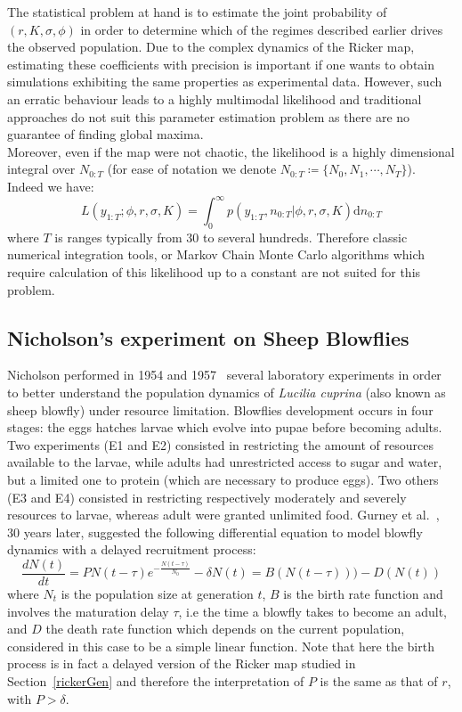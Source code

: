 \documentclass[12pt]{article}
\begin{document}
	The statistical problem at hand is to estimate the joint probability of $(r, K, \sigma, \phi)$ in order to determine which of the regimes described earlier drives the observed population. Due to the complex dynamics of the Ricker map, estimating these coefficients with precision is important if one wants to obtain simulations exhibiting the same properties as experimental data. However, such an erratic behaviour leads to a highly multimodal likelihood and traditional approaches do not suit this parameter estimation problem as there are no guarantee of finding global maxima. \\
	Moreover, even if the map were not chaotic, the likelihood is a highly dimensional integral over $N_{0:T}$ (for ease of notation we denote $N_{0:T} \coloneqq \{N_0, N_1, \cdots, N_T\}$). Indeed we have:
	\begin{equation}
	L(y_{1:T}; \phi, r, \sigma, K) = \int_{0}^{\infty}p(y_{1:T}, n_{0:T} | \phi, r, \sigma, K)\mathrm{d}n_{0:T}
	\end{equation}
	where $T$ is ranges typically from 30 to several hundreds. Therefore classic numerical integration tools, or Markov Chain Monte Carlo algorithms which require calculation of this likelihood up to a constant are not suited for this problem. 
	
	\subsection{Nicholson's experiment on Sheep Blowflies} \label{(Nicholson)}
	Nicholson performed in 1954 and 1957~\cite{nicholson1954outline, nicholson1957self} several
	laboratory experiments in order to better understand the population dynamics of \emph{Lucilia cuprina} (also known as sheep blowfly)
	under resource limitation. Blowflies development occurs in four stages: the eggs hatches larvae which evolve into pupae before becoming adults. Two experiments  (E1 and E2) consisted in restricting the amount of resources available to the larvae, while adults had unrestricted access to sugar and water, but a limited one to protein (which are necessary to produce eggs). Two others (E3 and E4) consisted in restricting respectively moderately and severely resources to larvae, whereas adult were granted unlimited food. Gurney et al.~\cite{gurney1980nicholson}, 30 years later, suggested the following differential equation to model blowfly dynamics with a delayed recruitment process:
	\begin{equation} \label{blow}
		\frac{d N(t)}{d t} = PN(t-\tau)e^{-\frac{N(t-\tau)}{N_0}} -  \delta N(t) = B(N(t-\tau))) - D(N(t))
	\end{equation} 
	where $N_t$ is the population size at generation $t$, $B$ is the birth rate function and involves the maturation delay $\tau$, i.e the time a blowfly takes to become an adult, and $D$ the death rate function which depends on the current population, considered in this case to be a simple linear function. Note that here the birth process is in fact a delayed version of the Ricker map studied in Section~\ref{rickerGen} and therefore the interpretation of $P$ is the same as that of $r$, with $P > \delta$.
	
\end{document}
